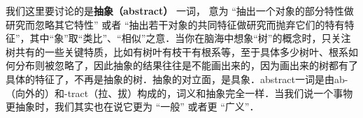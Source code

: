 
我们这里要讨论的是\textbf{抽象（abstract）} 一词， 意为 “抽出一个对象的部分特性做研究而忽略其它特性” 或者 “抽出若干对象的共同特征做研究而抛弃它们的特有特征”，其中“象”取“类比”、“相似”之意．当你在脑海中想象“树”的概念时，只关注树共有的一些关键特质，比如有树叶有枝干有根系等，至于具体多少树叶、根系如何分布则被忽略了，因此抽象的结果往往是不能画出来的，因为画出来的树都有了具体的特征了，不再是抽象的树．抽象的对立面，是具象．abstract一词是由ab-（向外的）和-tract（拉、拔）构成的，词义和抽象完全一样．当我们说一个事物更抽象时，我们其实也在说它更为 “一般” 或者更 “广义”．

